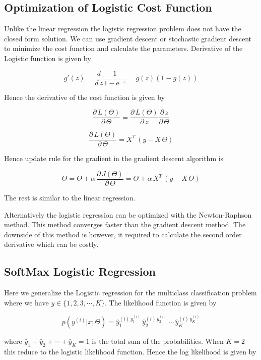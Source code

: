 \documentclass[11pt]{article}
\theoremstyle{definition}
\begin{document}
\subsection{Optimization of Logistic Cost Function} 

Unlike the linear regression the logistic regression problem does not have the closed form solution. 
We can use gradient descent or stochastic gradient descent to minimize the cost function and calculate the parameters. Derivative of the Logistic function is given by 

$$
g'(z) = \frac{d}{d\,z} \frac{1}{1-\text{e}^{-z}} = g(z)(1-g(z)) 
$$


Hence the derivative of the cost function is given by 

$$
\frac{\partial\, L(\Theta)}{\partial\, \Theta}  = \frac{\partial\, L(\Theta)}{\partial\, z}  \frac{\partial\, z}{\partial\, \Theta}
$$

$$
\frac{\partial\, L(\Theta)}{\partial\, \Theta} = X^T \, (y - X\, \Theta)
$$


Hence update rule for the gradient in the gradient descent algorithm is 

$$
\Theta =\Theta + \alpha \, \frac{\partial\, J(\Theta)}{\partial \, \Theta} = \Theta +  \alpha \,  X^T \, (y - X\, \Theta)
$$

The rest is similar to the linear regression. 

Alternatively the logistic regression can be optimized with the Newton-Raphson method. This method converges faster than the gradient descent method. The downside of this method is however, it required to calculate the second order derivative which can be costly. 



\subsection{SoftMax Logistic Regression}

Here we generalize the Logistic regression for the multiclass classification problem where we have $y\in \{1, 2, 3, \cdots, K\}$. The likelihood function is given by 

$$
p(y^{(i)}|x;\Theta) = \hat{y}^{(i)\, y^{(i)}_1}_1 \, \hat{y}^{(i)\, y^{(i)}_2}_2 \, \cdots \, \hat{y}^{(i)\, y^{(i)}_K}_K
$$

where $\hat{y}_1 + \hat{y}_2 +\cdots + \hat{y}_K = 1 $ is the total sum of the probabilities. When $K=2$ this reduce to the logistic likelihood function. Hence the log likelihood is given by 
\end{document}
